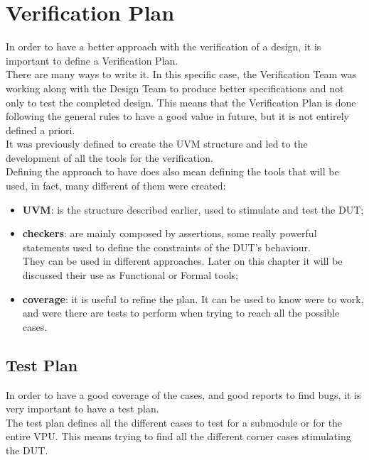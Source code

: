 \section{Verification Plan}
In order to have a better approach with the verification of a design, it is important to define a Verification Plan.\\
There are many ways to write it. In this specific case, the Verification Team was working along with the Design Team to produce better specifications and not only to test the completed design. This means that the Verification Plan is done following the general rules to have a good value in future, but it is not entirely defined a priori.\\

It was previously defined to create the UVM structure and led to the development of all the tools for the verification. \\
Defining the approach to have does also mean defining the tools that will be used, in fact, many different of them were created:
\begin{itemize}
    \item \textbf{UVM}: is the structure described earlier, used to stimulate and test the DUT;
    
    \item \textbf{checkers}: are mainly composed by assertions, some really powerful statements used to define the constraints of the DUT's behaviour. \\
    They can be used in different approaches. Later on this chapter it will be discussed their use as Functional or Formal tools;
    
    \item \textbf{coverage}: it is useful to refine the plan. It can be used to know were to work, and were there are tests to perform when trying to reach all the possible cases.
    
\end{itemize}
\subsection{Test Plan}
In order to have a good coverage of the cases, and good reports to find bugs, it is very important to have a test plan.\\

The test plan defines all the different cases to test for a submodule or for the entire VPU. This means trying to find all the different corner cases stimulating the DUT.\\

